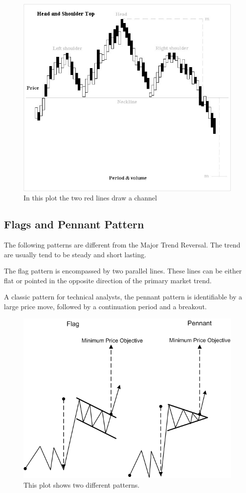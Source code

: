 \documentclass[conference]{IEEEtran}
\begin{document}
\begin{figure}[H]
    \centerline{\includegraphics[scale=0.45]{Pic/pic3.jpg}}
    \caption{In this plot the two red lines draw a channel}
\end{figure}


\subsection*{Flags and Pennant Pattern}
The following patterns are different from the Major Trend Reversal. The trend are usually 
tend to be steady and short lasting.

The flag pattern is encompassed by two parallel lines. These lines can be either flat or
pointed in the opposite direction of the primary market trend. 

A classic pattern for technical analysts, the pennant pattern is identifiable by a large 
price move, followed by a continuation period and a breakout.

\begin{figure}[H]
    \centerline{\includegraphics[scale=0.45]{Pic/pic4.png}}
    \caption{This plot shows two different patterns.}
\end{figure}
\end{document}
